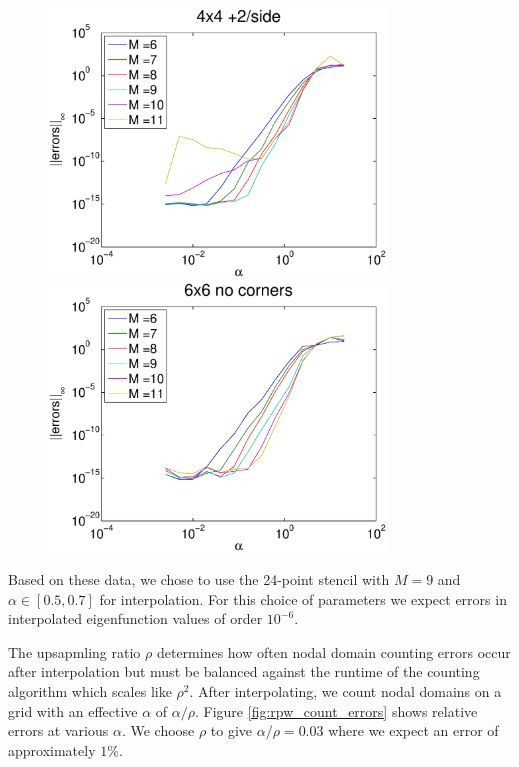 \documentclass{report}
\begin{document}
\begin{figure}
  \begin{center}
    \includegraphics[width=0.8\textwidth]{figs/interpolation/error_norms_3.eps}
    \linebreak
    \includegraphics[width=0.8\textwidth]{figs/interpolation/error_norms_4.eps}
  \end{center}
\end{figure}

Based on these data, we chose to use the 24-point stencil with $M=9$ and $\alpha \in [0.5, 0.7]$ for interpolation. For this choice of parameters we expect errors in interpolated eigenfunction values of order $10^{-6}$.

The upsapmling ratio $\rho$ determines how often nodal domain counting errors occur after interpolation but must be balanced against the runtime of the counting algorithm which scales like $\rho^{2}$. After interpolating, we count nodal domains on a grid with an effective $\alpha$ of $\alpha / \rho$. Figure \ref{fig:rpw_count_errors} shows relative errors at various $\alpha$. We choose $\rho$ to give $\alpha / \rho = 0.03$ where we expect an error of approximately $1\%$.
\end{document}
